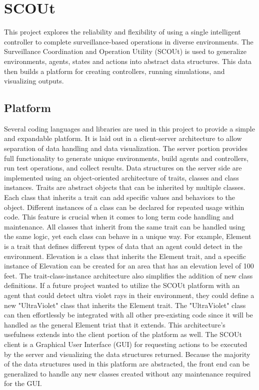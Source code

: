 

\chapter{SCOUt}
This project explores the reliability and flexibility of using a single intelligent controller to complete surveillance-based operations in diverse environments.
The Surveillance Coordination and Operation Utility (SCOUt) is used to generalize environments, agents, states and actions into abstract data structures.
This data then builds a platform for creating controllers, running simulations, and visualizing outputs.



\section{Platform}
Several coding languages and libraries are used in this project to provide a simple and expandable platform.
It is laid out in a client-server architecture to allow separation of data handling and data visualization.
The server portion provides full functionality to generate unique environments, build agents and controllers, run test operations, and collect results.
Data structures on the server side are implemented using an object-oriented architecture of traits, classes and class instances.
Traits are abstract objects that can be inherited by multiple classes.
Each class that inherits a trait can add specific values and behaviors to the object.
Different instances of a class can be declared for repeated usage within code.
This feature is crucial when it comes to long term code handling and maintenance.
All classes that inherit from the same trait can be handled using the same logic, yet each class can behave in a unique way.
For example, Element is a trait that defines different types of data that an agent could detect in the environment.
Elevation is a class that inherits the Element trait, and a specific instance of Elevation can be created for an area that has an elevation level of 100 feet.
The trait-class-instance architecture also simplifies the addition of new class definitions.
If a future project wanted to utilize the SCOUt platform with an agent that could detect ultra violet rays in their environment, they could define a new "UltraViolet" class that inherits the Element trait.
The "UltraViolet" class can then effortlessly be integrated with all other pre-existing code since it will be handled as the general Element triat that it extends.
This architecture's usefulness extends into the client portion of the platform as well.
The SCOUt client is a Graphical User Interface (GUI) for requesting actions to be executed by the server and visualizing the data structures returned.
Because the majority of the data structures used in this platform are abstracted, the front end can be generalized to handle any new classes created without any maintenance required for the GUI.


